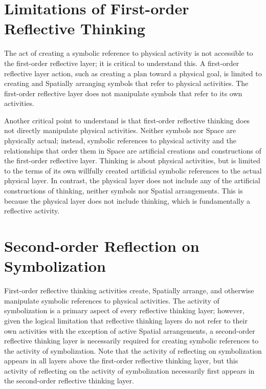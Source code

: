 \section{Limitations of First-order Reflective Thinking}

The act of creating a symbolic reference to physical activity is not
accessible to the first-order reflective layer; it is critical to
understand this.  A first-order reflective layer action, such as
creating a plan toward a physical goal, is limited to creating and
Spatially arranging symbols that refer to physical activities.  The
first-order reflective layer does not manipulate symbols that refer to
its own activities.

Another critical point to understand is that first-order reflective
thinking does not directly manipulate physical activities.  Neither
symbols nor Space are physically actual; instead, symbolic references
to physical activity and the relationships that order them in Space
are artificial creations and constructions of the first-order
reflective layer.  Thinking is about physical activities, but is
limited to the terms of its own willfully created artificial symbolic
references to the actual physical layer.  In contrast, the physical
layer does not include any of the artificial constructions of
thinking, neither symbols nor Spatial arrangements.  This is because
the physical layer does not include thinking, which is fundamentally a
reflective activity.

\section{Second-order Reflection on Symbolization}

First-order reflective thinking activities create, Spatially arrange,
and otherwise manipulate symbolic references to physical activities.
The activity of symbolization is a primary aspect of every reflective
thinking layer; however, given the logical limitation that reflective
thinking layers do not refer to their own activities with the
exception of active Spatial arrangements, a second-order reflective
thinking layer is necessarily required for creating symbolic
references to the activity of symbolization.  Note that the activity
of reflecting on symbolization appears in all layers above the
first-order reflective thinking layer, but this activity of reflecting
on the activity of symbolization necessarily first appears in the
second-order reflective thinking layer.

